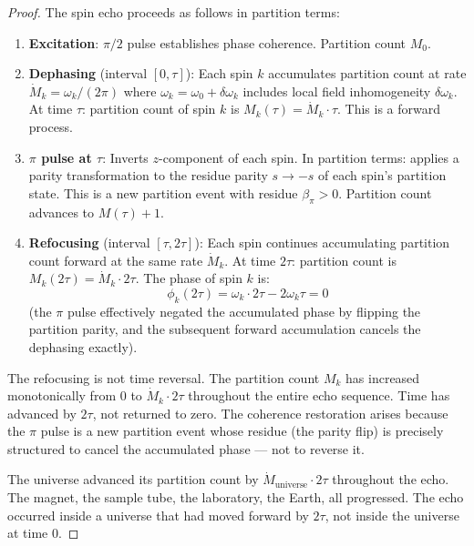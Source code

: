 \begin{proof}
The spin echo proceeds as follows in partition terms:
\begin{enumerate}
    \item \textbf{Excitation}: $\pi/2$ pulse establishes phase coherence.
          Partition count $M_0$.
    \item \textbf{Dephasing} (interval $[0,\tau]$): Each spin $k$ accumulates
          partition count at rate $\dot{M}_k = \omega_k/(2\pi)$ where $\omega_k
          = \omega_0 + \delta\omega_k$ includes local field inhomogeneity
          $\delta\omega_k$. At time $\tau$: partition count of spin $k$ is
          $M_k(\tau) = \dot{M}_k \cdot \tau$. This is a forward process.
    \item \textbf{$\pi$ pulse at $\tau$}: Inverts $z$-component of each spin.
          In partition terms: applies a parity transformation to the residue
          parity $s \to -s$ of each spin's partition state. This is a new
          partition event with residue $\beta_\pi > 0$. Partition count advances
          to $M(\tau) + 1$.
    \item \textbf{Refocusing} (interval $[\tau, 2\tau]$): Each spin continues
          accumulating partition count forward at the same rate $\dot{M}_k$.
          At time $2\tau$: partition count is $M_k(2\tau) = \dot{M}_k \cdot
          2\tau$. The phase of spin $k$ is:
          \begin{equation}
              \phi_k(2\tau) = \omega_k \cdot 2\tau - 2\omega_k\tau = 0
          \end{equation}
          (the $\pi$ pulse effectively negated the accumulated phase by flipping
          the partition parity, and the subsequent forward accumulation cancels
          the dephasing exactly).
\end{enumerate}
The refocusing is not time reversal. The partition count $M_k$ has increased
monotonically from $0$ to $\dot{M}_k \cdot 2\tau$ throughout the entire echo
sequence. Time has advanced by $2\tau$, not returned to zero. The coherence
restoration arises because the $\pi$ pulse is a new partition event whose
residue (the parity flip) is precisely structured to cancel the accumulated
phase --- not to reverse it.

The universe advanced its partition count by $\dot{M}_{\mathrm{universe}} \cdot
2\tau$ throughout the echo. The magnet, the sample tube, the laboratory, the
Earth, all progressed. The echo occurred inside a universe that had moved
forward by $2\tau$, not inside the universe at time 0.
\end{proof}


